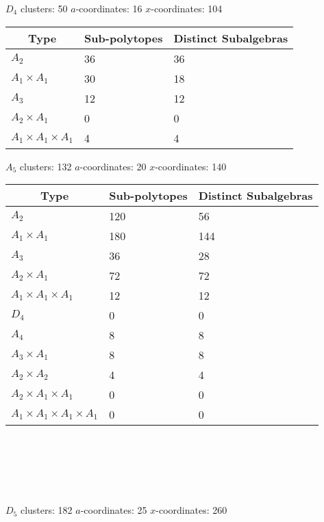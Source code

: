 \documentclass[12pt]{article}
\begin{document}
{\Huge\underline{\(D_4\)}} \quad clusters: 50 \qquad \(a\)-coordinates: 16 \qquad \(x\)-coordinates: 104\\

\begin{tabular}{ | l | l | l |}
\multicolumn{1}{c}{Type} &  \multicolumn{1}{c}{Sub-polytopes}  &  \multicolumn{1}{c}{Distinct Subalgebras} \\
\hline \(A_2\) & 36 & 36 \\ 
\hline \(A_1 \times A_1\) & 30 & 18 \\ \hline 
\hline \(A_3\) & 12 & 12 \\ 
\hline \(A_2 \times A_1\) & 0 & 0 \\ 
\hline \(A_1 \times A_1 \times A_1\) & 4 & 4 \\ 
\hline
\end{tabular} 

{\Huge\underline{\(A_5\)}} \quad clusters: 132 \qquad \(a\)-coordinates: 20 \qquad \(x\)-coordinates: 140\\

\begin{tabular}{ | l | l | l |}
\multicolumn{1}{c}{Type} &  \multicolumn{1}{c}{Sub-polytopes}  &  \multicolumn{1}{c}{Distinct Subalgebras} \\
\hline \(A_2\) & 120 & 56 \\ 
\hline \(A_1 \times A_1\) & 180 & 144 \\ \hline 
\hline \(A_3\) & 36 & 28 \\ 
\hline \(A_2 \times A_1\) & 72 & 72 \\ 
\hline \(A_1 \times A_1 \times A_1\) & 12 & 12 \\ \hline 
\hline \(D_4\) & 0 & 0 \\ 
\hline \(A_4\) & 8 & 8 \\ 
\hline \(A_3 \times A_1\) & 8 & 8 \\ 
\hline \(A_2 \times A_2\) & 4 & 4 \\ 
\hline \(A_2 \times A_1 \times A_1\) & 0 & 0 \\ 
\hline \(A_1 \times A_1 \times A_1 \times A_1\) & 0 & 0 \\ 
\hline
\end{tabular} \\ \\ \\ \\ \\


{\Huge\underline{\(D_5\)}} \quad clusters: 182 \qquad \(a\)-coordinates: 25 \qquad \(x\)-coordinates: 260\\
\end{document}
